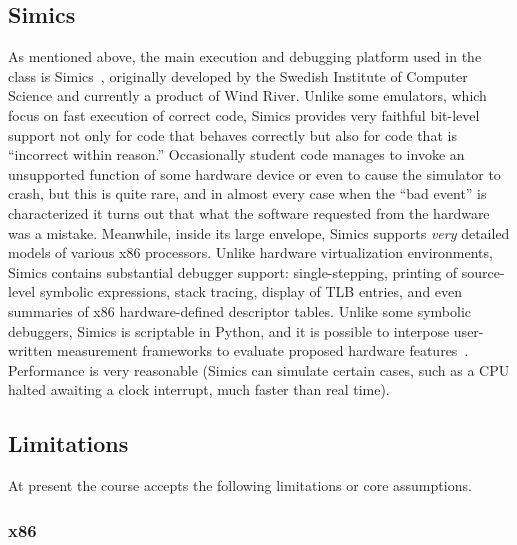 \subsection{Simics}

As mentioned above, the main execution and debugging
platform used in the class is
Simics~\cite{simics},
originally developed by the Swedish Institute of
Computer Science and
currently a product of Wind River.
Unlike some emulators,
which focus on fast execution of correct code,
Simics
provides very faithful bit-level support
not only for code that behaves correctly but
also for code that is ``incorrect within reason.''
Occasionally student code manages to invoke an unsupported
function of some hardware device or even to cause the
simulator to crash, but this is quite rare, and in almost
every case when the ``bad event'' is characterized it turns
out that what the software requested from the hardware was
a mistake.
Meanwhile, inside its large envelope, Simics supports
\textit{very} detailed models of various x86 processors.
Unlike hardware virtualization environments,
Simics contains substantial debugger support:
single-stepping,
printing of source-level symbolic
expressions,
stack tracing,
display of TLB entries,
and even summaries of x86 hardware-defined descriptor tables.
Unlike some symbolic debuggers,
Simics is scriptable in Python,
and it is possible to interpose user-written measurement
frameworks to evaluate proposed hardware
features~\cite{UW-GEMS,SimFlex,FeS2}.
Performance is very reasonable (Simics can simulate certain
cases, such as a CPU halted awaiting a clock interrupt,
much faster than real time).


\subsection{Limitations}

At present the course accepts the following limitations
or core assumptions.

\subsubsection{x86}

